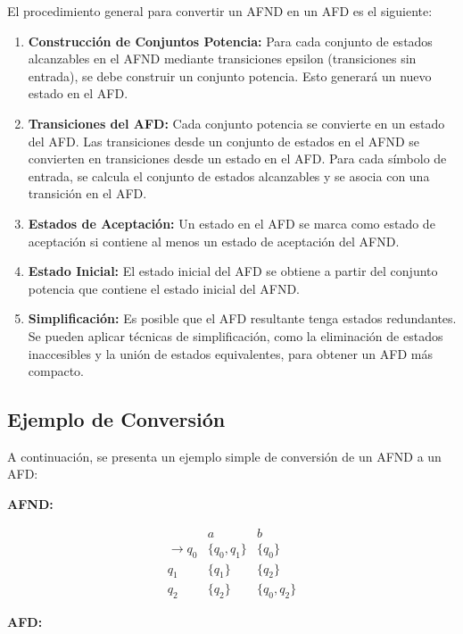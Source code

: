 \documentclass[11pt]{article} %
\begin{document}
	
	El procedimiento general para convertir un AFND en un AFD es el siguiente:
	
	\begin{enumerate}
		\item \textbf{Construcción de Conjuntos Potencia:} Para cada conjunto de estados alcanzables en el AFND mediante transiciones epsilon (transiciones sin entrada), se debe construir un conjunto potencia. Esto generará un nuevo estado en el AFD.
		
		\item \textbf{Transiciones del AFD:} Cada conjunto potencia se convierte en un estado del AFD. Las transiciones desde un conjunto de estados en el AFND se convierten en transiciones desde un estado en el AFD. Para cada símbolo de entrada, se calcula el conjunto de estados alcanzables y se asocia con una transición en el AFD.
		
		\item \textbf{Estados de Aceptación:} Un estado en el AFD se marca como estado de aceptación si contiene al menos un estado de aceptación del AFND.
		
		\item \textbf{Estado Inicial:} El estado inicial del AFD se obtiene a partir del conjunto potencia que contiene el estado inicial del AFND.
		
		\item \textbf{Simplificación:} Es posible que el AFD resultante tenga estados redundantes. Se pueden aplicar técnicas de simplificación, como la eliminación de estados inaccesibles y la unión de estados equivalentes, para obtener un AFD más compacto.
	\end{enumerate}
	
	\subsection{Ejemplo de Conversión}
	
	A continuación, se presenta un ejemplo simple de conversión de un AFND a un AFD:
	
	\textbf{AFND:}
	
	\[
	\begin{matrix}
		& a & b \\
		\rightarrow q_0 & \{q_0, q_1\} & \{q_0\} \\
		q_1 & \{q_1\} & \{q_2\} \\
		q_2 & \{q_2\} & \{q_0, q_2\}
	\end{matrix}
	\]
	
	\textbf{AFD:}
	
\end{document}
